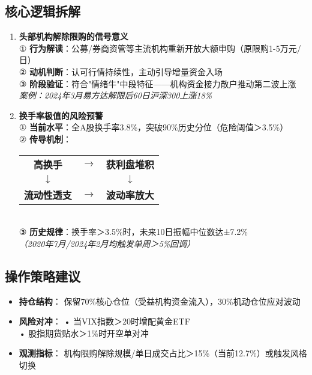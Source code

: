 \subsection{核心逻辑拆解}
\begin{enumerate}[leftmargin=*, nosep]
    \item \textbf{头部机构解除限购的信号意义}  \\
    ① \textbf{行为解读}：公募/券商资管等主流机构重新开放大额申购（原限购1-5万元/日） \\
    ② \textbf{动机判断}：认可行情持续性，主动引导增量资金入场 \\
    ③ \textbf{阶段验证}：{\color{red}符合"情绪牛"中段特征——机构资金接力散户推动第二波上涨} \\
    \textit{案例：2024年3月易方达解限后60日沪深300上涨18\%}

    \item \textbf{换手率极值的风险预警}  \\
    ① \textbf{当前水平}：全A股换手率3.8\%，突破90\%历史分位（危险阈值＞3.5\%） \\
    ② \textbf{传导机制}：\\
    \begin{tabular}{c c c}
        \textbf{高换手} & $\rightarrow$ & \textbf{获利盘堆积} \\
        $\downarrow$ & & $\downarrow$ \\
        \textbf{流动性透支} & $\rightarrow$ & \textbf{波动率放大}
    \end{tabular}
 \\
    ③ \textbf{历史规律}：换手率＞3.5\%时，未来10日振幅中位数达±7.2\% \\
    \textit{（2020年7月/2024年2月均触发单周＞5\%回调）}
\end{enumerate}

\subsection{操作策略建议}
\begin{itemize}[leftmargin=*, nosep]
    \item \textbf{持仓结构}：  
    保留70\%核心仓位（受益机构资金流入），30\%机动仓位应对波动
    
    \item \textbf{风险对冲}：  
    • 当VIX指数＞20时增配黄金ETF \\ 
    • 股指期货贴水＞1\%时开空单对冲
    
    \item \textbf{观测指标}：  
    机构限购解除规模/单日成交占比＞15\%（当前12.7\%）或触发风格切换
\end{itemize}

